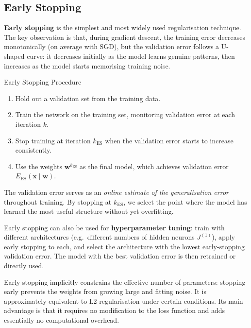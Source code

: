 \documentclass[11pt,a4paper]{article}
\newcommand{\term}[1]{\textcolor{DefGreen}{\textbf{#1}}}
\begin{document}
\subsection{Early Stopping}

\term{Early stopping} is the simplest and most widely used regularisation technique. The key observation is that, during gradient descent, the training error decreases monotonically (on average with SGD), but the validation error follows a U-shaped curve: it decreases initially as the model learns genuine patterns, then increases as the model starts memorising training noise.

\begin{algobox}{Early Stopping Procedure}
\begin{enumerate}
  \item Hold out a validation set from the training data.
  \item Train the network on the training set, monitoring validation error at each iteration $k$.
  \item Stop training at iteration $k_{\mathrm{ES}}$ when the validation error starts to increase consistently.
  \item Use the weights $\mathbf{w}^{k_{\mathrm{ES}}}$ as the final model, which achieves validation error $E_{\mathrm{ES}}(\mathbf{x} \mid \mathbf{w})$.
\end{enumerate}
\end{algobox}

The validation error serves as an \emph{online estimate of the generalisation error} throughout training. By stopping at $k_{\mathrm{ES}}$, we select the point where the model has learned the most useful structure without yet overfitting.

Early stopping can also be used for \term{hyperparameter tuning}: train with different architectures (e.g.\ different numbers of hidden neurons $J^{(1)}$), apply early stopping to each, and select the architecture with the lowest early-stopping validation error. The model with the best validation error is then retrained or directly used.

\begin{insightbox}
Early stopping implicitly constrains the effective number of parameters: stopping early prevents the weights from growing large and fitting noise. It is approximately equivalent to L2 regularisation under certain conditions. Its main advantage is that it requires no modification to the loss function and adds essentially no computational overhead.
\end{insightbox}
\end{document}
